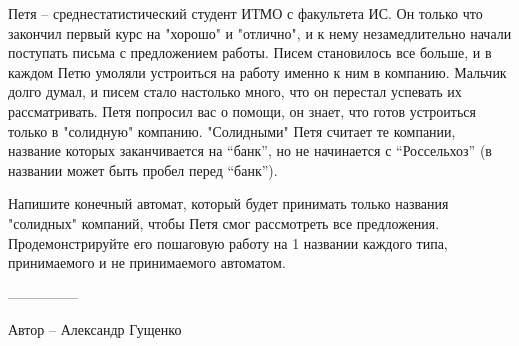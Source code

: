 \question
Петя -- среднестатистический студент ИТМО с факультета ИС. Он только что закончил первый курс на "хорошо" и "отлично", и к нему незамедлительно начали поступать письма с предложением работы. Писем становилось все больше, и в каждом Петю умоляли устроиться на работу именно к ним в компанию. Мальчик долго думал, и писем стало настолько много, что он перестал успевать их рассматривать. Петя попросил вас о помощи, он знает, что готов устроиться только в "солидную" компанию. "Солидными" Петя считает те компании, название которых заканчивается на “банк”, но не начинается с “Россельхоз” (в названии может быть пробел перед “банк”). 

Напишите конечный автомат, который будет принимать только названия "солидных" компаний, чтобы Петя смог рассмотреть все предложения. Продемонстрируйте его пошаговую работу на 1 названии каждого типа, принимаемого и не принимаемого автоматом.

---------------

Автор -- Александр Гущенко
